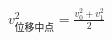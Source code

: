\documentclass[border=2.5pt]{standalone}
\begin{document}
$\displaystyle v_{\text{位移中点}}^2=\frac{v_0^2+v_1^2}{2}$
\end{document}
